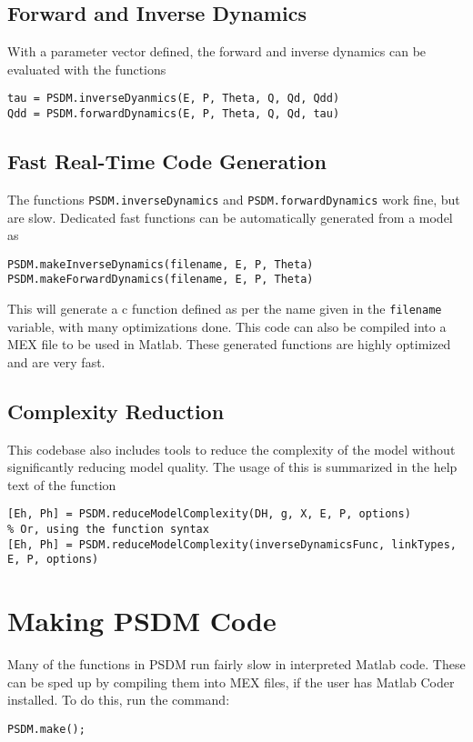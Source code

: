 \documentclass[12pt]{article}
\begin{document}
\subsection{Forward and Inverse Dynamics}

With a parameter vector defined, the forward and inverse dynamics can be evaluated with the functions
\begin{lstlisting}
tau = PSDM.inverseDyanmics(E, P, Theta, Q, Qd, Qdd)
Qdd = PSDM.forwardDynamics(E, P, Theta, Q, Qd, tau)
\end{lstlisting}

\subsection{Fast Real-Time Code Generation}
The functions \texttt{PSDM.inverseDynamics} and \texttt{PSDM.forwardDynamics} work fine, but are slow. Dedicated fast functions can be automatically generated from a model as
\begin{lstlisting}
PSDM.makeInverseDynamics(filename, E, P, Theta)
PSDM.makeForwardDynamics(filename, E, P, Theta)
\end{lstlisting}\vspace{1em}
This will generate a c function defined as per the name given in the \texttt{filename} variable, with many optimizations done. This code can also be compiled into a MEX file to be used in Matlab. These generated functions are highly optimized and are very fast.

\subsection{Complexity Reduction}
This codebase also includes tools to reduce the complexity of the model without significantly reducing model quality. The usage of this is summarized in the help text of the function
\begin{lstlisting}
[Eh, Ph] = PSDM.reduceModelComplexity(DH, g, X, E, P, options)
% Or, using the function syntax
[Eh, Ph] = PSDM.reduceModelComplexity(inverseDynamicsFunc, linkTypes, E, P, options)
\end{lstlisting}

\section{Making PSDM Code}

Many of the functions in PSDM run fairly slow in interpreted Matlab code. These can be sped up by compiling them into MEX files, if the user has Matlab Coder installed. To do this, run the command:
\begin{lstlisting}
PSDM.make();
\end{lstlisting}
\end{document}
